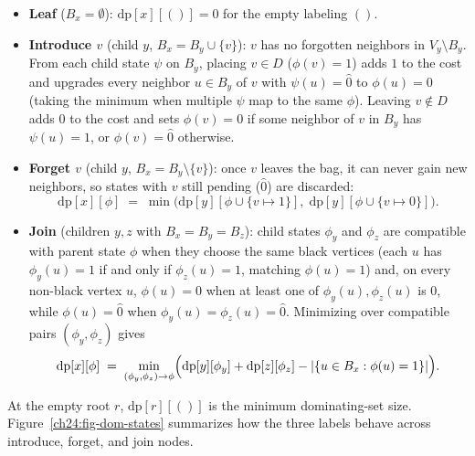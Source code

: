 \begin{itemize}
  \item \textbf{Leaf} ($B_x=\emptyset$): $\mathrm{dp}[x][()]=0$ for the empty labeling $()$.
  \item \textbf{Introduce $v$} (child $y$, $B_x=B_y\cup\{v\}$): $v$ has no
        forgotten neighbors in $V_y\setminus B_y$. From each child state $\psi$ on
        $B_y$, placing $v\in D$ ($\phi(v)=1$) adds $1$ to the cost and upgrades
        every neighbor $u\in B_y$ of $v$ with $\psi(u)=\hat 0$ to $\phi(u)=0$
        (taking the minimum when multiple $\psi$ map to the same $\phi$). Leaving
        $v\notin D$ adds $0$ to the cost and sets $\phi(v)=0$ if some neighbor of
        $v$ in $B_y$ has $\psi(u)=1$, or $\phi(v)=\hat 0$ otherwise.
  \item \textbf{Forget $v$} (child $y$, $B_x=B_y\setminus\{v\}$): once $v$ leaves
        the bag, it can never gain new neighbors, so states with $v$ still pending
        ($\hat 0$) are discarded:
        \[
          \mathrm{dp}[x][\phi] \;=\; \min\bigl(\mathrm{dp}[y][\phi\cup\{v\mapsto 1\}],\;
          \mathrm{dp}[y][\phi\cup\{v\mapsto 0\}]\bigr).
        \]
  \item \textbf{Join} (children $y,z$ with $B_x=B_y=B_z$): child states $\phi_y$
        and $\phi_z$ are compatible with parent state $\phi$ when they choose the
        same black vertices (each $u$ has $\phi_y(u)=1$ if and only if $\phi_z(u)=1$, matching $\phi(u)=1$) and, on
        every non-black vertex $u$, $\phi(u)=0$ when at least one of $\phi_y(u),
        \phi_z(u)$ is $0$, while $\phi(u)=\hat 0$ when $\phi_y(u)=\phi_z(u)=\hat 0$.
        Minimizing over compatible pairs $(\phi_y,\phi_z)$ gives
        \[
          \mathrm{dp}[x][\phi] \;=\; \min_{(\phi_y,\phi_z)\to\phi}
          \Bigl(\mathrm{dp}[y][\phi_y] + \mathrm{dp}[z][\phi_z]
          - \lvert\{u\in B_x : \phi(u)=1\}\rvert\Bigr).
        \]
\end{itemize}

At the empty root $r$, $\mathrm{dp}[r][()]$ is the minimum dominating-set size.
Figure~\ref{ch24:fig-dom-states} summarizes how the three labels behave across
introduce, forget, and join nodes.

